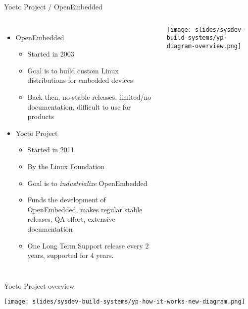 \begin{frame}{Yocto Project / OpenEmbedded}
  \begin{columns}
  \begin{itemize}
  \item OpenEmbedded
    \begin{itemize}
    \item Started in 2003
    \item Goal is to build custom Linux distributions for embedded
      devices
    \item Back then, no stable releases, limited/no documentation,
      difficult to use for products
    \end{itemize}
  \item Yocto Project
    \begin{itemize}
    \item Started in 2011
    \item By the Linux Foundation
    \item Goal is to {\em industrialize} OpenEmbedded
    \item Funds the development of OpenEmbedded, makes regular stable
      releases, QA effort, extensive documentation
    \item One Long Term Support release every 2 years, supported
      for 4 years.
    \end{itemize}
  \end{itemize}
  \texttt{[image: slides/sysdev-build-systems/yp-diagram-overview.png]}
\end{columns}
\end{frame}

\begin{frame}{Yocto Project overview}
  \begin{center}
    \texttt{[image: slides/sysdev-build-systems/yp-how-it-works-new-diagram.png]}
  \end{center}
\end{frame}


